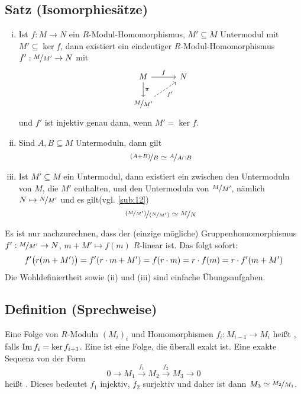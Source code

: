 \subsection[Satz: Homomorphie- und Isomorphiesätze für Moduln]{Satz (Isomorphiesätze)} %
\label{sub:29}
\begin{enumerate}[(i)]
	\item Ist $f : M \to N$ ein $R$-Modul-Homomorphismus, $M' \subseteq M$ Untermodul mit $M'  \subseteq \ker f$, dann existiert ein eindeutiger $R$-Modul-Homomorphismus 
	$f'  : \nicefrac{M}{M'} \to N$ mit 
	\[
		\begin{tikzcd}
			M \rar{f} \dar{\pi }& N \\
			\nicefrac{M}{M'} \urar[dashed, swap]{f'}& 
		\end{tikzcd}
	\]
	und $f'$ ist injektiv genau dann, wenn $M' = \ker f$.
	\item Sind $A,B \subseteq M$ Untermoduln, dann gilt 
	\[
		\nicefrac{(A+B)}{B} \simeq \nicefrac{A}{A \cap B}
	\]
	\item Ist $M' \subseteq M$ ein Untermodul, dann existiert ein  zwischen den Untermoduln von $M$, die $M'$ enthalten, und den Untermoduln
	von $\nicefrac{M}{M'}$, nämlich $N \mapsto \nicefrac{N}{M'}$ und es gilt\hfill(vgl. \ref{sub:12})
	\[
		\nicefrac{\enbrace*{\nicefrac{M}{M'}} }{\enbrace*{\nicefrac{N}{M'}} } \simeq \nicefrac{M}{N}
	\] 
\end{enumerate}
Es ist nur nachzurechnen, dass der (einzige mögliche) Gruppenhomomorphismus $f' : \nicefrac{M}{M'} \to N$, $m + M' \mapsto f(m)$ $R$-linear ist. Das folgt sofort:
\begin{align*}
	f' \enbrace[\big]{r(m + M')} = f' (r \cdot m + M')= f(r \cdot m) = r \cdot f(m) = r \cdot f'(m+ M')
\end{align*} 
Die Wohldefiniertheit sowie (ii) und (iii) sind einfache Übungsaufgaben. \bewende

\subsection[Definition: Exakte Sequenz]{Definition (Sprechweise)} %
\label{sub:210}
Eine Folge von $R$-Moduln $(M_i)_i$ und Homomorphismen $f_i : M_{i-1} \to M_{i}$ heißt , falls $\im f_{i} = \ker{f_{i+1}}$.
Eine  ist eine Folge, die überall exakt ist. Eine exakte Sequenz von der Form 
\[
	0 \to M_1 \xrightarrow{f_1} M_2  \xrightarrow{f_2} M_3 \to 0  
\]
heißt . Dieses bedeutet $f_1$ injektiv, $f_2$ surjektiv und daher ist dann $M_3 \simeq \nicefrac{M_2}{M_1}$.

